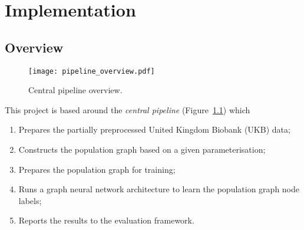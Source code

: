 \chapter{Implementation}


\section{Overview}

\begin{figure}[h]
    \texttt{[image: pipeline\_overview.pdf]}
    \caption{Central pipeline overview.}\label{pipeline-overview}
\end{figure}

This project is based around the \textit{central pipeline} (Figure~\ref{pipeline-overview}) which 
\begin{enumerate}
    \item Prepares the partially preprocessed United Kingdom Biobank (UKB) data;
    \item Constructs the population graph based on a given parameterisation;
    \item Prepares the population graph for training;
    \item Runs a graph neural network architecture to learn the population graph node labels;
    \item Reports the results to the evaluation framework.
\end{enumerate}

